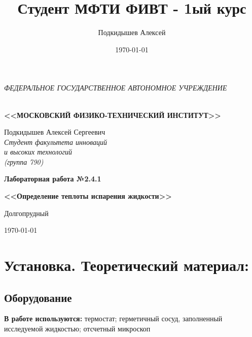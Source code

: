 \documentclass[a4paper, 12pt]{article}
\author{Подкидышев Алексей}
\title{Студент МФТИ ФИВТ - 1ый курс}
\date{\today}
\theoremstyle{plain} %
\theoremstyle{definition} %
\theoremstyle{remark} %
\begin{document}

\thispagestyle{empty}
\begin{center}
	\textit{\MakeTextUppercase{федеральное государственное автономное учреждение}}
		
	\vspace{0.5ex}
	
	\textbf{ \\ \MakeTextUppercase{<<Московский Физико-технический институт>>}}
\end{center}
\vspace{13ex}
\begin{flushright}
	\noindent
	{Подкидышев Алексей Сергеевич}
	\\
	\textit{Студент факультета инноваций\\ и высоких технологий\\(группа 790)}
\end{flushright}
\begin{center}
	\vspace{23ex}
	\begin{LARGE}
	
	\textbf{Лабораторная работа №2.4.1}	

	\end{LARGE}	
	\vspace{1ex}
		
	\begin{large}
	
	\textbf{{<<Определение теплоты испарения жидкости>>}}
	
	\end{large}
	
	\vfill
	Долгопрудный 
	
	{\today}
\end{center}

\newpage

\section{Установка. Теоретический материал:}
\subsection{Оборудование}
\large
\textbf{В работе используются:} термостат; герметичный сосуд, заполненный исследуемой жидкостью; отсчетный микроскоп\\[3ex]

\end{document}
